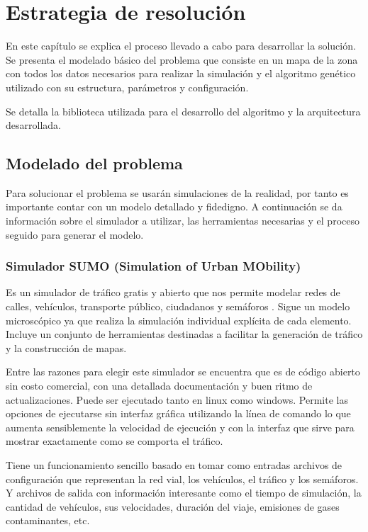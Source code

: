 \chapter{Estrategia de resolución}

En este capítulo se explica el proceso llevado a cabo para desarrollar la solución. Se presenta el modelado básico del problema que consiste en un mapa de la zona con todos los datos necesarios para realizar la simulación y el algoritmo genético utilizado con su estructura, parámetros y configuración. 

Se detalla la biblioteca utilizada para el desarrollo del algoritmo y la arquitectura desarrollada.



\section{Modelado del problema }

Para solucionar el problema se usarán simulaciones de la realidad, por tanto es importante contar con un modelo detallado y fidedigno. A continuación se da información sobre el simulador a utilizar, las herramientas necesarias y el proceso seguido para generar el modelo. 

\subsection{Simulador SUMO (Simulation of Urban MObility)}

Es un simulador de tráfico gratis y abierto que nos permite modelar redes de calles, vehículos, transporte público, ciudadanos y semáforos \citep{SUMO}. Sigue un modelo microscópico ya que realiza la simulación individual explícita de cada elemento. Incluye un conjunto de herramientas destinadas  a facilitar la generación de tráfico y la construcción de mapas. 

Entre las razones para elegir este simulador se encuentra que es de código abierto sin costo comercial, con una detallada documentación y buen ritmo de actualizaciones. Puede ser ejecutado tanto en linux como windows. Permite las opciones de ejecutarse sin interfaz gráfica utilizando la línea de comando lo que aumenta sensiblemente la velocidad de ejecución y con la interfaz que sirve para mostrar exactamente como se comporta el tráfico.


Tiene un funcionamiento sencillo basado en tomar como entradas archivos de configuración que representan la red vial, los vehículos, el tráfico y los semáforos. Y archivos de salida con información interesante como el tiempo de simulación, la cantidad de vehículos, sus velocidades, duración del viaje, emisiones de gases contaminantes, etc. 

